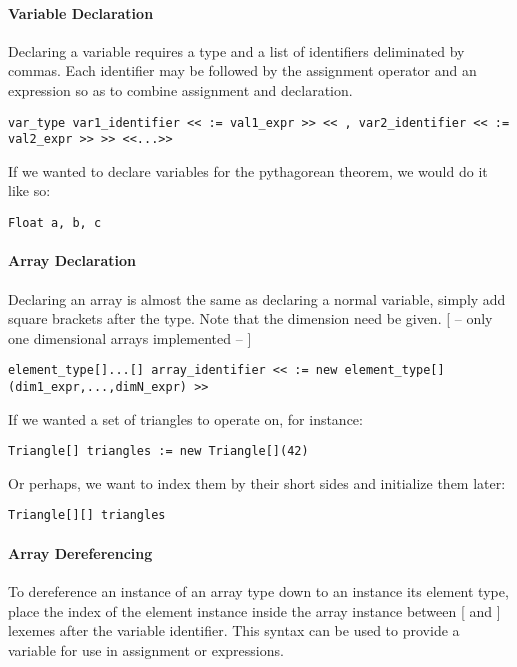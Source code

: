 \paragraph{Variable Declaration}
Declaring a variable requires a type and a list of identifiers deliminated by commas. Each identifier may be followed by the assignment operator and an expression so as to combine assignment and declaration.

\begin{lstlisting}
var_type var1_identifier << := val1_expr >> << , var2_identifier << := val2_expr >> >> <<...>>
\end{lstlisting}

If we wanted to declare variables for the pythagorean theorem, we would do it like so:

\begin{lstlisting}[caption=Variable Initialization for the Pythagorean Theorem,backgroundcolor=\color{tintedorange}]
Float a, b, c
\end{lstlisting}

\paragraph{Array Declaration}
Declaring an array is almost the same as declaring a normal variable, simply add square brackets after the type. Note that the dimension need be given. [ -- only one dimensional arrays implemented -- ]

\begin{lstlisting}
element_type[]...[] array_identifier << := new element_type[](dim1_expr,...,dimN_expr) >>
\end{lstlisting}

If we wanted a set of triangles to operate on, for instance:

\begin{lstlisting}[caption=Array Declaration and Instantiation of Many Triangles, backgroundcolor=\color{tintedorange}]
Triangle[] triangles := new Triangle[](42)
\end{lstlisting}

Or perhaps, we want to index them by their short sides and initialize them later:

\begin{lstlisting}[caption=Array Declaration of a 2-Degree Triangle Array,backgroundcolor=\color{tintedorange}]
Triangle[][] triangles
\end{lstlisting}

\paragraph{Array Dereferencing}
To dereference an instance of an array type down to an instance its element type, place the index of the element instance inside the array instance between [ and ] lexemes after the variable identifier. This syntax can be used to provide a variable for use in assignment or expressions.

